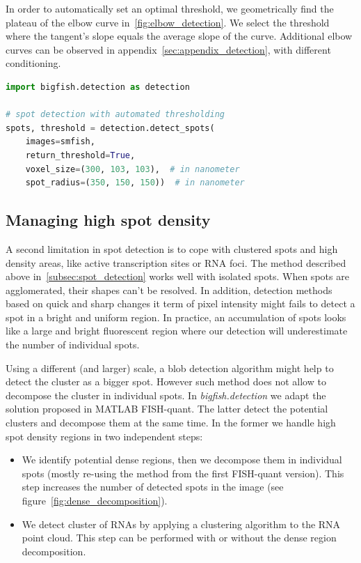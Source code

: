 In order to automatically set an optimal threshold, we geometrically find the plateau of the elbow curve in~\ref{fig:elbow_detection}.
We select the threshold where the tangent's slope equals the average slope of the curve.
Additional elbow curves can be observed in appendix~\ref{sec:appendix_detection}, with different conditioning.\\

\begin{minipage}{0.9\textwidth}
\begin{lstlisting}[language=Python]
import bigfish.detection as detection

# spot detection with automated thresholding
spots, threshold = detection.detect_spots(
    images=smfish,
    return_threshold=True,
    voxel_size=(300, 103, 103),  # in nanometer
    spot_radius=(350, 150, 150))  # in nanometer
\end{lstlisting}
\end{minipage}

\subsection{Managing high spot density}
\label{subsec:dense_decomposition}

A second limitation in spot detection is to cope with clustered spots and high density areas, like active transcription sites or \ac{RNA} foci.
The method described above in~\ref{subsec:spot_detection} works well with isolated spots.
When spots are agglomerated, their shapes can't be resolved.
In addition, detection methods based on quick and sharp changes it term of pixel intensity might fails to detect a spot in a bright and uniform region.
In practice, an accumulation of spots looks like a large and bright fluorescent region where our detection will underestimate the number of individual spots.

Using a different (and larger) scale, a blob detection algorithm\cite{walt_scikit-image_2014} might help to detect the cluster as a bigger spot.
However such method does not allow to decompose the cluster in individual spots.
In \emph{bigfish.detection} we adapt the solution proposed in MATLAB FISH-quant\cite{mueller_fish-quant_2013}.
The latter detect the potential clusters and decompose them at the same time.
In the former we handle high spot density regions in two independent steps:

\begin{itemize}
	\item We identify potential dense regions, then we decompose them in individual spots (mostly re-using the method from the first FISH-quant version).
	This step increases the number of detected spots in the image (see figure~\ref{fig:dense_decomposition}).
	\item We detect cluster of \ac{RNA}s by applying a clustering algorithm to the \ac{RNA} point cloud.
	This step can be performed with or without the dense region decomposition.
\end{itemize}

